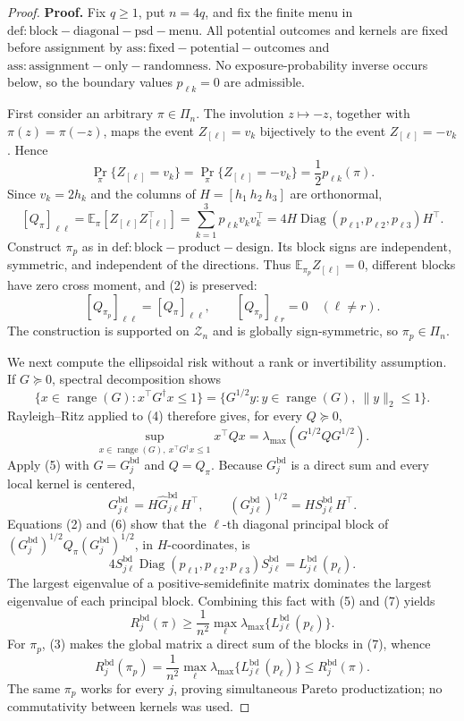 \documentclass{article}
\begin{document}
\begin{proof}
\textbf{Proof.}
Fix \(q\ge1\), put \(n=4q\), and fix the finite menu in \(\mathrm{def:block-diagonal-psd-menu}\).  All potential outcomes and kernels are fixed before assignment by \(\mathrm{ass:fixed-potential-outcomes}\) and \(\mathrm{ass:assignment-only-randomness}\).  No exposure-probability inverse occurs below, so the boundary values \(p_{\ell k}=0\) are admissible.

First consider an arbitrary \(\pi\in\Pi_n\).  The involution \(z\mapsto-z\), together with \(\pi(z)=\pi(-z)\), maps the event \(Z_{[\ell]}=v_k\) bijectively to the event \(Z_{[\ell]}=-v_k\).  Hence
\[
\Pr_\pi\{Z_{[\ell]}=v_k\}
=\Pr_\pi\{Z_{[\ell]}=-v_k\}
=\frac12p_{\ell k}(\pi). \tag{1}
\]
Since \(v_k=2h_k\) and the columns of \(H=[h_1\ h_2\ h_3]\) are orthonormal,
\[
[Q_\pi]_{\ell\ell}
=\mathbb E_\pi[Z_{[\ell]}Z_{[\ell]}^\top]
=\sum_{k=1}^3p_{\ell k}v_kv_k^\top
=4H\operatorname{Diag}(p_{\ell1},p_{\ell2},p_{\ell3})H^\top. \tag{2}
\]
Construct \(\pi_p\) as in \(\mathrm{def:block-product-design}\).  Its block signs are independent, symmetric, and independent of the directions.  Thus \(\mathbb E_{\pi_p}Z_{[\ell]}=0\), different blocks have zero cross moment, and (2) is preserved:
\[
[Q_{\pi_p}]_{\ell\ell}=[Q_\pi]_{\ell\ell},
\qquad [Q_{\pi_p}]_{\ell r}=0\quad(\ell\ne r). \tag{3}
\]
The construction is supported on \(\mathcal Z_n\) and is globally sign-symmetric, so \(\pi_p\in\Pi_n\).

We next compute the ellipsoidal risk without a rank or invertibility assumption.  If \(G\succeq0\), spectral decomposition shows
\[
\{x\in\operatorname{range}(G):x^\top G^\dagger x\le1\}
=\{G^{1/2}y:y\in\operatorname{range}(G),\ \|y\|_2\le1\}. \tag{4}
\]
Rayleigh--Ritz applied to (4) therefore gives, for every \(Q\succeq0\),
\[
\sup_{x\in\operatorname{range}(G),\ x^\top G^\dagger x\le1}x^\top Qx
=\lambda_{\max}(G^{1/2}QG^{1/2}). \tag{5}
\]
Apply (5) with \(G=G_j^{\mathrm{bd}}\) and \(Q=Q_\pi\).  Because \(G_j^{\mathrm{bd}}\) is a direct sum and every local kernel is centered,
\[
G_{j\ell}^{\mathrm{bd}}=H\widehat G_{j\ell}^{\mathrm{bd}}H^\top,
\qquad
(G_{j\ell}^{\mathrm{bd}})^{1/2}=HS_{j\ell}^{\mathrm{bd}}H^\top. \tag{6}
\]
Equations (2) and (6) show that the \(\ell\)-th diagonal principal block of
\((G_j^{\mathrm{bd}})^{1/2}Q_\pi(G_j^{\mathrm{bd}})^{1/2}\), in \(H\)-coordinates, is
\[
4S_{j\ell}^{\mathrm{bd}}
\operatorname{Diag}(p_{\ell1},p_{\ell2},p_{\ell3})
S_{j\ell}^{\mathrm{bd}}
=L_{j\ell}^{\mathrm{bd}}(p_\ell). \tag{7}
\]
The largest eigenvalue of a positive-semidefinite matrix dominates the largest eigenvalue of each principal block.  Combining this fact with (5) and (7) yields
\[
R_j^{\mathrm{bd}}(\pi)
\ge \frac1{n^2}\max_\ell
\lambda_{\max}\{L_{j\ell}^{\mathrm{bd}}(p_\ell)\}. \tag{8}
\]
For \(\pi_p\), (3) makes the global matrix a direct sum of the blocks in (7), whence
\[
R_j^{\mathrm{bd}}(\pi_p)
=\frac1{n^2}\max_\ell
\lambda_{\max}\{L_{j\ell}^{\mathrm{bd}}(p_\ell)\}
\le R_j^{\mathrm{bd}}(\pi). \tag{9}
\]
The same \(\pi_p\) works for every \(j\), proving simultaneous Pareto productization; no commutativity between kernels was used.


\end{proof}
\end{document}
